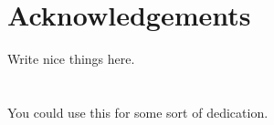 
\chapter*{Acknowledgements}

Write nice things here.

\chapter*{}

\begin{list}{}{%
  \setlength{\leftmargin}{2.1cm}%
  \setlength{\rightmargin}{2.1cm}%
}\item[]
\begin{center}
You could use this for some sort of dedication.
\end{center}
\end{list}


